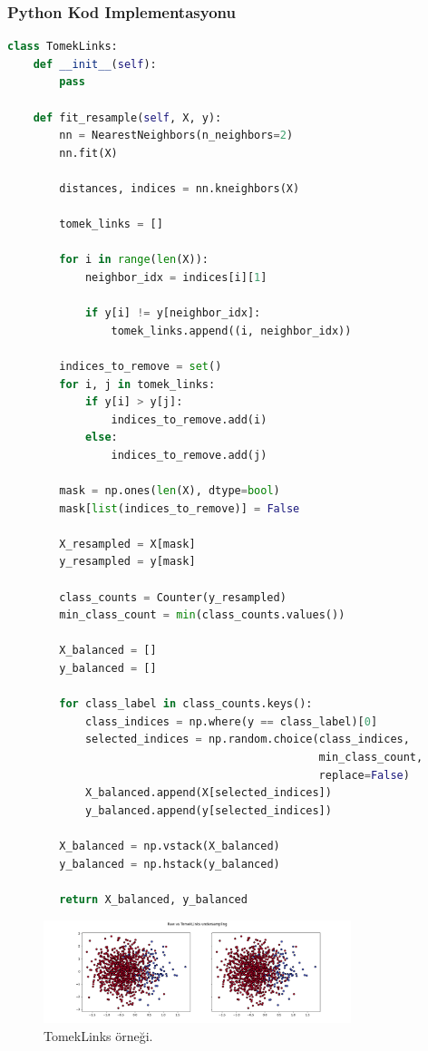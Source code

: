 \subsubsection{Python Kod Implementasyonu}

\begin{lstlisting}[language=Python]
class TomekLinks:
    def __init__(self):
        pass

    def fit_resample(self, X, y):
        nn = NearestNeighbors(n_neighbors=2)
        nn.fit(X)
        
        distances, indices = nn.kneighbors(X)
        
        tomek_links = []
        
        for i in range(len(X)):
            neighbor_idx = indices[i][1]
            
            if y[i] != y[neighbor_idx]:
                tomek_links.append((i, neighbor_idx))
        
        indices_to_remove = set()
        for i, j in tomek_links:
            if y[i] > y[j]:
                indices_to_remove.add(i)
            else:
                indices_to_remove.add(j)
        
        mask = np.ones(len(X), dtype=bool)
        mask[list(indices_to_remove)] = False
        
        X_resampled = X[mask]
        y_resampled = y[mask]

        class_counts = Counter(y_resampled)
        min_class_count = min(class_counts.values())

        X_balanced = []
        y_balanced = []

        for class_label in class_counts.keys():
            class_indices = np.where(y == class_label)[0]
            selected_indices = np.random.choice(class_indices, 
                                                min_class_count, 
                                                replace=False)
            X_balanced.append(X[selected_indices])
            y_balanced.append(y[selected_indices])

        X_balanced = np.vstack(X_balanced)
        y_balanced = np.hstack(y_balanced)
        
        return X_balanced, y_balanced
\end{lstlisting}

\newpage

\begin{figure}[h]
    \centering
    \includegraphics[width=0.8\textwidth]{images/Raw vs TomekLinks undersampling.png}
    \caption{TomekLinks örneği.}
    \label{fig:enter-label}
\end{figure}

